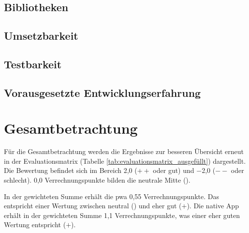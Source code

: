 \subsection{Bibliotheken} \label{sec:6-bibliotheken}


\subsection{Umsetzbarkeit} \label{sec:6-umsetzung}


\subsection{Testbarkeit} \label{sec:6-testbarkeit}


\subsection{Vorausgesetzte Entwicklungserfahrung} \label{sec:6-vorausgesetzte-entwicklungserfahrung}


%

\section{Gesamtbetrachtung}
Für die Gesamtbetrachtung werden die Ergebnisse zur besseren Übersicht erneut in der Evaluationsmatrix (Tabelle \ref{tab:evaluationsmatrix_ausgefüllt}) dargestellt. Die Bewertung befindet sich im Bereich 2,0 ($++$ oder gut) und $-$2,0 ($--$ oder schlecht). 0,0 Verrechnungspunkte bilden die neutrale Mitte (\Circle).

 In der gewichteten Summe erhält die \ac{pwa} 0,55 Verrechnungspunkte. Das entspricht einer Wertung zwischen neutral (\Circle) und eher gut ($+$). Die native App erhält in der gewichteten Summe 1,1 Verrechnungspunkte, was einer eher guten Wertung entspricht ($+$).

